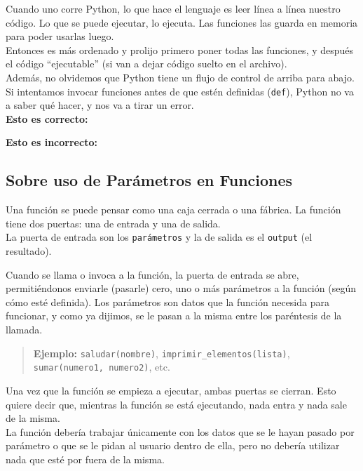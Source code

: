\documentclass[
  letterpaper,
  DIV=11,
  numbers=noendperiod]{scrreprt}
\begin{document}
Cuando uno corre Python, lo que hace el lenguaje es leer línea a línea
nuestro código. Lo que se puede ejecutar, lo ejecuta. Las funciones las
guarda en memoria para poder usarlas luego.\\
Entonces es más ordenado y prolijo primero poner todas las funciones, y
después el código ``ejecutable'' (si van a dejar código suelto en el
archivo).\\

Además, no olvidemos que Python tiene un flujo de control de arriba para
abajo. Si intentamos invocar funciones antes de que estén definidas
(\texttt{def}), Python no va a saber qué hacer, y nos va a tirar un
error.\\

\textbf{Esto es correcto:}

\textbf{Esto es incorrecto:}

\subsection{Sobre uso de Parámetros en
Funciones}\label{sobre-uso-de-paruxe1metros-en-funciones}

Una función se puede pensar como una caja cerrada o una fábrica. La
función tiene dos puertas: una de entrada y una de salida.\\
La puerta de entrada son los \texttt{parámetros} y la de salida es el
\texttt{output} (el resultado).

Cuando se llama o invoca a la función, la puerta de entrada se abre,
permitiéndonos enviarle (pasarle) cero, uno o más parámetros a la
función (según cómo esté definida). Los parámetros son datos que la
función necesida para funcionar, y como ya dijimos, se le pasan a la
misma entre los paréntesis de la llamada.\\

\begin{quote}
\textbf{Ejemplo:} \texttt{saludar(nombre)},
\texttt{imprimir\_elementos(lista)}, \texttt{sumar(numero1,\ numero2)},
etc.
\end{quote}

Una vez que la función se empieza a ejecutar, ambas puertas se cierran.
Esto quiere decir que, mientras la función se está ejecutando, nada
entra y nada sale de la misma.\\
La función debería trabajar únicamente con los datos que se le hayan
pasado por parámetro o que se le pidan al usuario dentro de ella, pero
no debería utilizar nada que esté por fuera de la misma.
\end{document}
